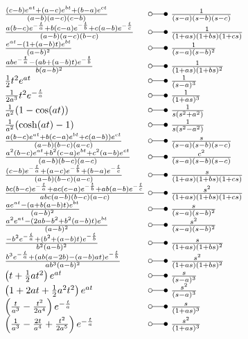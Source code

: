 \[ \begin{array}{@{}l@{ ~ \laplace ~ }l@{}}
\frac{(c - b) e^{at} + (a - c) e^{bt} + (b - a) e^{ct}}{(a - b) (a - c) (c - b)} &
    \frac{1}{(s - a) (s - b) (s - c)} \\
\frac{a (b - c) e^{-\frac{t}{a}} + b (c - a) e^{-\frac{t}{b}} + c (a - b) e^{-\frac{t}{c}}}{(a - b) (a - c) (b - c)} &
    \frac{1}{(1 + as) (1 + bs) (1 + cs)} \\
\frac{e^{at} - (1 + (a - b) t) e^{bt}}{(a - b)^2} &
    \frac{1}{(s - a) (s - b)^2} \\
\frac{a b e^{-\frac{t}{a}} - (ab + (a - b) t) e^{-\frac{t}{b}}}{b (a - b)^2} &
    \frac{1}{(1 + as) (1 + bs)^2} \\
\frac{1}{2} t^2 e^{at} &
    \frac{1}{(s - a)^3} \\
\frac{1}{2 a^3} t^2 e^{-\frac{t}{a}} &
    \frac{1}{(1 + as)^3} \\
\frac{1}{a^2} (1 - \cos(at)) &
    \frac{1}{s (s^2 + a^2)} \\
\frac{1}{a^2} (\cosh(at) - 1) &
    \frac{1}{s (s^2 - a^2)} \\
\frac{a (b - c) e^{at} + b (c - a) e^{bt} + c (a - b)) e^{ct}}{(a - b) (b - c) (a - c)} &
    \frac{s}{(s - a) (s - b) (s - c)} \\
\frac{a^2 (b - c) e^{at} + b^2 (c - a) e^{bt} + c^2 (a - b) e^{ct}}{(a - b) (b - c) (a - c)} &
    \frac{c^2}{(s - a) (s - b) (s - c)} \\
\frac{(c - b) e^{-\frac{t}{a}} + (a - c) e^{-\frac{t}{b}} + (b - a) e^{-\frac{t}{c}}}{(a - b) (b - c) (a - c)} &
    \frac{s}{(1 + as) (1 + bs) (1 + cs)} \\
\frac{bc (b - c) e^{-\frac{t}{a}} + ac (c - a) e^{-\frac{t}{b}} + ab (a - b) e^{-\frac{t}{c}}}{abc (a - b) (b - c) (a - c)} &
    \frac{s^2}{(1 + as) (1 + bs) (1 + cs)} \\
\frac{a e^{at} - (a + b (a - b) t) e^{bt}}{(a - b)^2} &
    \frac{s}{(s - a) (s - b)^2} \\
\frac{a^2 e^{at} - (2 ab - b^2 + b^2 (a - b) t) e^{bt}}{(a - b)^2} &
    \frac{s^2}{(s - a) (s - b)^2} \\
\frac{-b^2 e^{-\frac{t}{a}} + (b^2 + (a - b) t) e^{-\frac{t}{b}}}{b^2 (a - b)^2} &
    \frac{s}{(1 + as) (1 + bs)^2} \\
\frac{b^3 e^{-\frac{t}{a}} + (ab (a - 2b) - (a - b) at) e^{-\frac{t}{b}}}{ab^3 (a - b)^2} &
    \frac{s^2}{(1 + as) (1 + bs)^2} \\
\left(t + \frac{1}{2} a t^2\right) e^{at} &
    \frac{s}{(s - a)^3} \\
\left(1 + 2at + \frac{1}{2} a^2 t^2\right) e^{at} &
    \frac{s^2}{(s - a)^3} \\
\left(\frac{t}{a^3} - \frac{t^2}{2 a^4}\right) e^{-\frac{t}{a}} &
    \frac{s}{(1 + as)^3} \\
\left(\frac{1}{a^3} - \frac{2t}{a^4} + \frac{t^2}{2 a^5}\right) e^{-\frac{t}{a}} &
    \frac{s^2}{(1 + as)^3} \\
\end{array} \]

